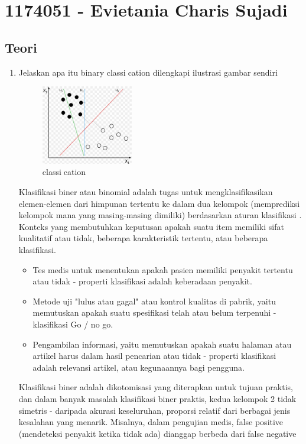 \section{1174051 - Evietania Charis Sujadi}
\subsection{Teori}
\begin{enumerate}
	\item Jelaskan apa itu binary classication dilengkapi ilustrasi gambar sendiri
	\hfill\break
	\begin{figure}[H]
		\includegraphics[width=4cm]{figures/1174038/2/1.jpg}
		\centering
		\caption{classication}
	\end{figure}
	Klasifikasi biner atau binomial adalah tugas untuk mengklasifikasikan elemen-elemen dari himpunan tertentu ke dalam dua kelompok (memprediksi kelompok mana yang masing-masing dimiliki) berdasarkan aturan klasifikasi . Konteks yang membutuhkan keputusan apakah suatu item memiliki sifat kualitatif atau tidak, beberapa karakteristik tertentu, atau beberapa klasifikasi.
	\begin{itemize}
		\item Tes medis untuk menentukan apakah pasien memiliki penyakit tertentu atau tidak - properti klasifikasi adalah keberadaan penyakit.
		\item Metode uji "lulus atau gagal" atau kontrol kualitas di pabrik, yaitu memutuskan apakah suatu spesifikasi telah atau belum terpenuhi - klasifikasi Go / no go.
		\item Pengambilan informasi, yaitu memutuskan apakah suatu halaman atau artikel harus dalam hasil pencarian atau tidak - properti klasifikasi adalah relevansi artikel, atau kegunaannya bagi pengguna.
	\end{itemize}
	\hfill\break
	Klasifikasi biner adalah dikotomisasi yang diterapkan untuk tujuan praktis, dan dalam banyak masalah klasifikasi biner praktis, 
	kedua kelompok 2 tidak simetris - daripada akurasi keseluruhan, proporsi relatif dari berbagai jenis kesalahan yang menarik. 
	Misalnya, dalam pengujian medis, false positive (mendeteksi penyakit ketika tidak ada) dianggap berbeda dari false negative 

\end{enumerate}
